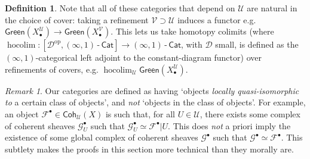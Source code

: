 \documentclass[11pt,fleqn]{article}
\theoremstyle{plain}
\theoremstyle{definition}
\newtheorem{definition}[theorem]{Definition}
\theoremstyle{remark}
\newtheorem{remark}[theorem]{Remark}
\numberwithin{equation}{theorem}
\newcommand{\cover}{\mathcal{U}}
\newcommand{\anothercover}{\mathcal{V}}
\newcommand{\restricted}{\mathbin{\big\vert}}
\newcommand{\infcat}{(\infty,1)\,\text{-}\,\mathsf{Cat}}
\newcommand{\gcohUX}{\mathsf{Coh}_{\cover}(X)}
\newcommand{\gccohX}{\mathsf{CCoh}(X)}
\newcommand{\greenX}{\mathsf{Green}(X_\bullet^\cover)}
\newcommand{\greenVX}{\mathsf{Green}(X_\bullet^\anothercover)}
\DeclareMathOperator{\hocolim}{hocolim}
\begin{document}
\begin{definition}
            Note that all of these categories that depend on $\cover$ are natural in the choice of cover: taking a refinement $\anothercover\supset\cover$ induces a functor e.g. $\greenX\to\greenVX$.
            This lets us take homotopy colimits (where $\hocolim\colon[\mathcal{D}^\mathrm{op},\infcat]\to\infcat$, with $\mathcal{D}$ small, is defined as the $(\infty,1)$-categorical left adjoint to the constant-diagram functor) over refinements of covers, e.g. $\hocolim_\cover\greenX$.
        \end{definition}

        \begin{remark}\label{remark:subcats-are-locally-q-iso-to}
            Our categories are defined as having `objects \emph{locally quasi-isomorphic to} a certain class of objects', and \emph{not} `objects in the class of objects'.
            For example, an object $\mathscr{F}^\bullet\in\gcohUX$ is such that, for all $U\in\cover$, there exists some complex of coherent sheaves $\mathscr{G}_U^\bullet$ such that $\mathscr{G}_U^\bullet\simeq \mathscr{F}^\bullet\restricted U$.
            This does \emph{not} a priori imply the existence of some global complex of coherent sheaves $\mathscr{G}^\bullet$ such that $\mathscr{G}^\bullet\simeq\mathscr{F}^\bullet$.
            This subtlety makes the proofs in this section more technical than they morally are.
        \end{remark}
\end{document}
